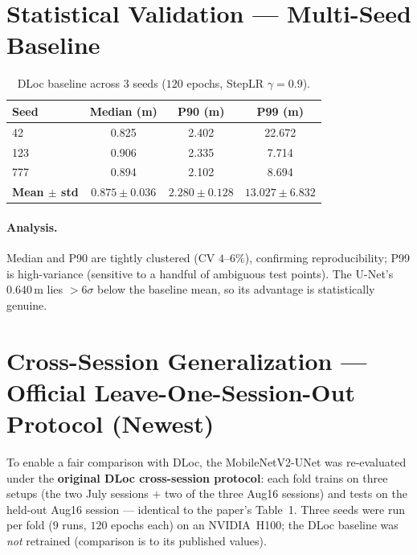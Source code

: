 \documentclass[11pt,a4paper]{article}
\begin{document}
\section{Statistical Validation --- Multi-Seed Baseline}

\begin{table}[H]
\centering
\caption{DLoc baseline across $3$ seeds ($120$ epochs, StepLR $\gamma=0.9$).}
\begin{tabular}{@{}lccc@{}}
\toprule
\textbf{Seed} & \textbf{Median (m)} & \textbf{P90 (m)} & \textbf{P99 (m)} \\
\midrule
42  & 0.825 & 2.402 & 22.672 \\
123 & 0.906 & 2.335 & 7.714  \\
777 & 0.894 & 2.102 & 8.694  \\
\midrule
\textbf{Mean $\pm$ std} & $\mathbf{0.875 \pm 0.036}$ & $\mathbf{2.280 \pm 0.128}$ & $\mathbf{13.027 \pm 6.832}$ \\
\bottomrule
\end{tabular}
\end{table}

\paragraph{Analysis.} Median and P90 are tightly clustered (CV $4$--$6\%$), confirming
reproducibility; P99 is high-variance (sensitive to a handful of ambiguous test points). The
U-Net's $0.640$\,m lies $>6\sigma$ below the baseline mean, so its advantage is statistically
genuine.

\section{Cross-Session Generalization --- Official Leave-One-Session-Out Protocol (Newest)}
\label{sec:cross_new}

To enable a fair comparison with DLoc, the MobileNetV2-UNet was re-evaluated under the
\textbf{original DLoc cross-session protocol}: each fold trains on three setups (the two July
sessions $+$ two of the three Aug16 sessions) and tests on the held-out Aug16 session ---
identical to the paper's Table~1. Three seeds were run per fold ($9$ runs, $120$ epochs each) on
an NVIDIA~H100; the DLoc baseline was \emph{not} retrained (comparison is to its published
values).
\end{document}

